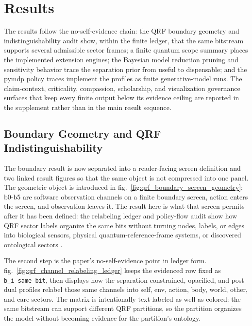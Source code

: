 \documentclass[
]{article}
\begin{document}
\newpage

\section{Results}\label{sec:results}

The results follow the no-self-evidence chain: the QRF boundary geometry
and indistinguishability audit show, within the finite ledger, that the
same bitstream supports several admissible sector frames; a finite
quantum scope summary places the implemented extension engines; the
Bayesian model reduction pruning and sensitivity behavior trace the
separation prior from useful to dispensable; and the pymdp policy traces
implement the profiles as finite generative-model runs. The
claim-context, criticality, compassion, scholarship, and visualization
governance surfaces that keep every finite output below its evidence
ceiling are reported in the supplement rather than in the main result
sequence.

\subsection{Boundary Geometry and QRF
Indistinguishability}\label{sec:results-qrf-boundary-geometry}

The boundary result is now separated into a reader-facing screen
definition and two linked result figures so that the same object is not
compressed into one panel. The geometric object is introduced in
fig.~\ref{fig:qrf_boundary_screen_geometry}: b0-b5 are software
observation channels on a finite boundary screen, action enters the
screen, and observation leaves it. The result here is what that screen
permits after it has been defined: the relabeling ledger and policy-flow
audit show how QRF sector labels organize the same bits without turning
nodes, labels, or edges into biological sensors, physical
quantum-reference-frame systems, or discovered ontological sectors
\citep{giacomini2019qrf, vanrietvelde2020perspective}.

The second step is the paper's no-self-evidence point in ledger form.
fig.~\ref{fig:qrf_channel_relabeling_ledger} keeps the evidenced row
fixed as \texttt{b\_i\ same\ bit}, then displays how the
separation-constrained, opacified, and post-dual profiles relabel those
same channels into self, env, action, body, world, other, and care
sectors. The matrix is intentionally text-labeled as well as colored:
the same bitstream can support different QRF partitions, so the
partition organizes the model without becoming evidence for the
partition's ontology.
\end{document}
